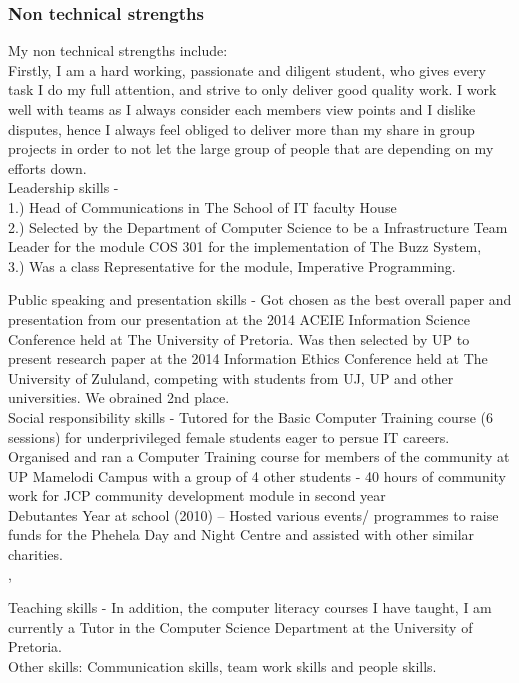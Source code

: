 \documentclass[hidelinks, 12pt, oneside]{article}
\begin{document}
\subsubsection{Non technical strengths}
My non technical strengths include: \\

Firstly, I am a hard working, passionate and diligent student, who gives every task I do my full attention, and strive to only deliver good quality work. I work well with teams as I always consider each members view points and I dislike disputes, hence I always feel obliged to deliver more than my share in group projects in order to not let the large group of people that are depending on my efforts down. 
\\
Leadership skills - 
 \\1.) Head of Communications in The School of IT faculty House
 \\2.) Selected by the Department of Computer Science to be a 	Infrastructure Team Leader for the module COS 301 for the implementation of The Buzz System, 
 \\3.) Was a class Representative for the module, Imperative Programming.
   
Public speaking and presentation skills - Got chosen as the best overall paper and presentation from our presentation at the 2014 ACEIE Information Science Conference held at The University of Pretoria. Was then selected by UP to present research paper at the 2014 Information Ethics Conference held at The University of Zululand, competing with students from UJ, UP and other universities. We obrained 2nd place. 
\\
Social responsibility skills - Tutored for the Basic Computer Training course (6 sessions) for underprivileged female students eager to persue IT careers.\\ 
Organised and ran a Computer Training course for members of the community at UP Mamelodi Campus with a group of 4 other students - 40 hours of community work for JCP community development module in second year \\

Debutantes Year at school (2010) – Hosted various events/ programmes to raise funds for the Phehela Day and Night Centre and assisted with other similar charities.\\,

Teaching skills - In addition, the computer literacy courses I have taught, I am currently a Tutor in the Computer Science Department at the University of Pretoria.
\\
Other skills: 
Communication skills, team work skills and people skills.
\end{document}
